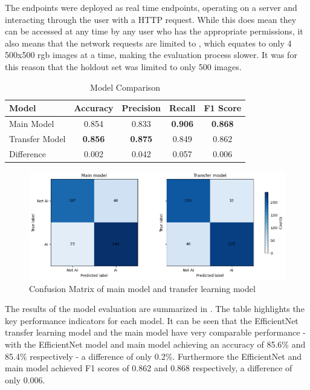 The endpoints were deployed as real time endpoints, operating on a server and interacting through the user with a HTTP request. While this does mean they can be accessed at any time by any user who has the appropriate permissions, it also means that the network requests are limited to , which equates to only 4 500x500 rgb images at a time, making the evaluation process slower. It was for this reason that the holdout set was limited to only 500 images.

\begin{table}[h]
\centering
\caption{Model Comparison}
\begin{tabular}{lcccc}
\toprule
\textbf{Model} & \textbf{Accuracy} & \textbf{Precision} & \textbf{Recall} & \textbf{F1 Score} \\
\midrule
Main Model     & 0.854          & 0.833          & \textbf{0.906} & \textbf{0.868} \\
Transfer Model & \textbf{0.856} & \textbf{0.875} & 0.849 & 0.862 \\
\midrule
Difference & 0.002 & 0.042 & 0.057 & 0.006 \\
\bottomrule
\end{tabular}
\label{tab:model_comparison}
\end{table}

\begin{figure}[h]
    \centering
    \includegraphics[width=0.9\linewidth]{figures/confusion_matrix.png} %
    \centering
    \caption{Confusion Matrix of main model and transfer learning model} %
    \label{fig:confusion_matrixes} %
\end{figure}

The results of the model evaluation are summarized in . The table highlights the key performance indicators for each model. It can be seen that the EfficientNet transfer learning model and the main model have very comparable performance - with the EfficientNet model and main model achieving an accuracy of 85.6\% and 85.4\% respectively - a difference of only 0.2\%. Furthermore the EfficientNet and main model achieved F1 scores of 0.862 and 0.868 respectively, a difference of only 0.006.

